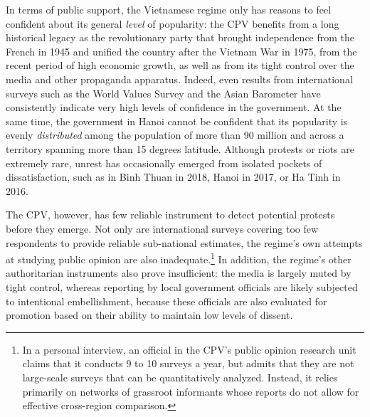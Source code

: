 \documentclass[12pt]{article}
\newcommand\fnote[1]{\footnote{\baselineskip=2\normalbaselineskip#1}}
\newcommand{\1}{\mathbbm{1}}
\begin{document}
In terms of public support, the Vietnamese regime only has reasons to feel confident about its general \textit{level} of popularity: the CPV benefits from a long historical legacy as the revolutionary party that brought independence from the French in 1945 and unified the country after the Vietnam War in 1975, from the recent period of high economic growth, as well as from its tight control over the media and other propaganda apparatus. Indeed, even results from international surveys such as the World Values Survey \citeyearpar{wvs} and the Asian Barometer \citeyearpar{abs} have consistently indicate very high levels of confidence in the government. At the same time, the government in Hanoi cannot be confident that its popularity is evenly \textit{distributed} among the population of more than 90 million and across a territory spanning more than 15 degrees latitude. Although protests or riots are extremely rare, unrest has occasionally emerged from isolated pockets of dissatisfaction, such as in Binh Thuan in 2018, Hanoi in 2017, or Ha Tinh in 2016. 

The CPV, however, has few reliable instrument to detect potential protests before they emerge. Not only are international surveys covering too few respondents to provide reliable sub-national estimates, the regime's own attempts at studying public opinion are also inadequate.\fnote{In a personal interview, an official in the CPV's public opinion research unit claims that it conducts 9 to 10 surveys a year, but admits that they are not large-scale surveys that can be quantitatively analyzed. Instead, it relies primarily on networks of grassroot informants whose reports do not allow for effective cross-region comparison.} In addition, the regime's other authoritarian instruments also prove insufficient: the media is largely muted by tight control, whereas reporting by local government officials are likely subjected to intentional embellishment, because these officials are also evaluated for promotion based on their ability to maintain low levels of dissent.
\end{document}
